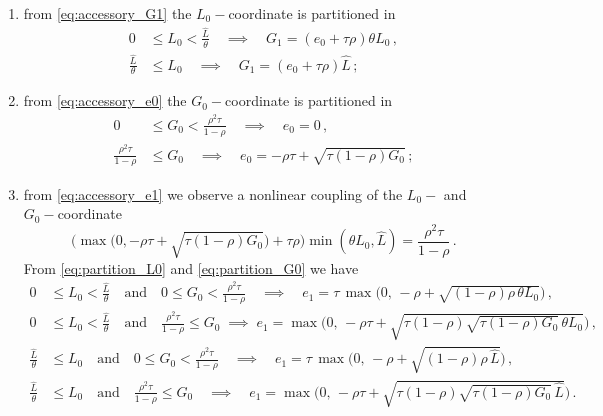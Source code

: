 \documentclass[a4paper,fleqn]{cas-sc}
\begin{document}
\begin{enumerate}
    \item from \eqref{eq:accessory_G1} the $L_0-$coordinate is partitioned in
    \begin{subequations}\label{eq:partition_L0}
    \begin{align}
        0 &\leq L_0 < \frac{\hat{L}}{\theta}\quad\implies\quad G_1=(e_0+\tau\rho)\theta L_0\,, \label{eq:partition_L0_1} \\ 
        \frac{\hat{L}}{\theta} &\leq L_0 \quad\implies\quad G_1=(e_0+\tau\rho)\hat{L}\,; \label{eq:partition_L0_2}
    \end{align}
    \end{subequations}
    \item from \eqref{eq:accessory_e0} the $G_0-$coordinate is partitioned in
    \begin{subequations}\label{eq:partition_G0}
    \begin{align}
        0 &\leq G_0 < \frac{\rho^2\tau}{1-\rho}\quad\implies\quad e_0=0\,, \label{eq:partition_G0_1} \\ 
        \frac{\rho^2\tau}{1-\rho} &\leq G_0 \quad\implies\quad e_0=-\rho\tau+\sqrt{\tau(1-\rho)G_0}\,; \label{eq:partition_G0_2}
    \end{align}
    \end{subequations}
    \item from \eqref{eq:accessory_e1} we observe a nonlinear coupling of the $L_0-$ and $G_0-$coordinate
    \begin{equation*}
        \bigg(\max\Big(0,-\rho\tau + \sqrt{\tau(1-\rho)G_0}\Big) + \tau\rho\bigg)\min(\theta L_0,\hat{L}) = \frac{\rho^2\tau}{1-\rho}\,.
    \end{equation*}
    From \eqref{eq:partition_L0} and \eqref{eq:partition_G0} we have
    \begin{subequations}\label{eq:partition_L0_G0}
    \begin{align}
        0 &\leq L_0 < \frac{\hat{L}}{\theta}\quad\text{and}\quad0\leq G_0 < \frac{\rho^2\tau}{1-\rho}\quad \implies\quad e_1=\tau\,\max\!\Big(0,\,-\rho+\sqrt{(1-\rho)\rho\,\theta L_0}\Big)\,, \label{eq:partition_L0_G0_1} \\
        0 &\leq L_0 < \frac{\hat{L}}{\theta}\quad\text{and}\quad\frac{\rho^2\tau}{1-\rho}\leq G_0\; \implies\; e_1=\max\!\bigg(0,\,-\rho\tau+\sqrt{\tau(1-\rho)\sqrt{\tau(1-\rho)G_0}\,\theta L_0}\bigg)\,, \label{eq:partition_L0_G0_2} \\
        \frac{\hat{L}}{\theta} &\leq L_0\quad\text{and}\quad0\leq G_0 < \frac{\rho^2\tau}{1-\rho}\quad \implies\quad e_1=\tau\,\max\!\Big(0,\,-\rho+\sqrt{(1-\rho)\rho\,\hat{L}}\Big)\,, \label{eq:partition_L0_G0_3} \\
        \frac{\hat{L}}{\theta} &\leq L_0\quad\text{and}\quad\frac{\rho^2\tau}{1-\rho}\leq G_0\quad \implies\quad e_1=\max\!\bigg(0,\,-\rho\tau+\sqrt{\tau(1-\rho)\sqrt{\tau(1-\rho)G_0}\,\hat{L}}\bigg) \label{eq:partition_L0_G0_4}\,.
    \end{align}
    \end{subequations}
\end{enumerate}
\end{document}
